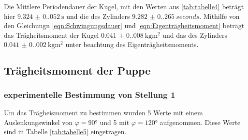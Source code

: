   Die Mittlere Periodendauer der Kugel, mit den Werten aus \ref{tab:tabelle4} beträgt hier $\qty{9.324(0.052)}{\second}$ und die des Zylinders $\qty{9.282(0.265)}{seconds}$.
  Mithilfe von den Gleichungn \ref{eqn:Schwingungsdauer} und \ref{eqn:Eigenträgheitsmoment} 
  beträgt das Trägheitsmoment der Kugel $\qty{0.041(0.008)}{\kilo\gram\meter\squared}$ und das des
  Zylinders $\qty{0.041(0.002)}{\kilo\gram\meter\squared}$ unter beachtung des Eigenträgheitsmoments.
  
  \subsection{Trägheitsmoment der Puppe}
    \subsubsection{experimentelle Bestimmung von Stellung 1}
    Um das Trägheismoment zu bestimmen wurden 5 Werte mit einem Auslenkungswinkel von $\varphi=90°$ und 5 mit $\varphi=120°$ aufgenommen.
    Diese Werte sind in Tabelle \ref{tab:tabelle5} eingetragen.


